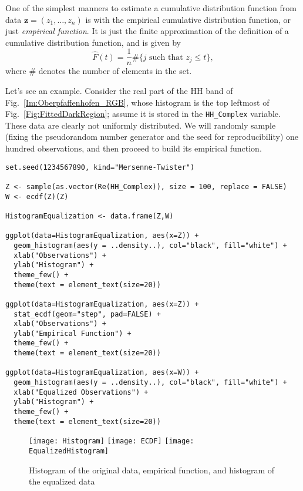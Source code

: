 One of the simplest manners to estimate a cumulative distribution function from data $\bm z=(z_1,\dots,z_n)$ is with the empirical cumulative distribution function, or just \textit{empirical function}.
It is just the finite approximation of the definition of a cumulative distribution function, and is given by
\begin{equation}
\widehat{F}(t) = \frac1n \#\{j \text{ such that } z_j\leq t\} ,
\end{equation}
where $\#$ denotes the number of elements in the set.

Let's see an example.
Consider the real part of the HH band of Fig.~\ref{Im:Oberpfaffenhofen_RGB}, whose histogram is the top leftmost of Fig.~\ref{Fig:FittedDarkRegion}; assume it is stored in the \verb|HH_Complex| variable.
These data are clearly not uniformly distributed.
We will randomly sample (fixing the pseudorandom number generator and the seed for reproducibility) one hundred observations, and then proceed to build its empirical function.

\begin{lstlisting}[frame=tb]
set.seed(1234567890, kind="Mersenne-Twister")

Z <- sample(as.vector(Re(HH_Complex)), size = 100, replace = FALSE)
W <- ecdf(Z)(Z)

HistogramEqualization <- data.frame(Z,W)
 
ggplot(data=HistogramEqualization, aes(x=Z)) +
  geom_histogram(aes(y = ..density..), col="black", fill="white") +
  xlab("Observations") +
  ylab("Histogram") + 
  theme_few() +
  theme(text = element_text(size=20))

ggplot(data=HistogramEqualization, aes(x=Z)) +
  stat_ecdf(geom="step", pad=FALSE) +
  xlab("Observations") +
  ylab("Empirical Function") + 
  theme_few() +
  theme(text = element_text(size=20))

ggplot(data=HistogramEqualization, aes(x=W)) +
  geom_histogram(aes(y = ..density..), col="black", fill="white") +
  xlab("Equalized Observations") +
  ylab("Histogram") + 
  theme_few() +
  theme(text = element_text(size=20))
\end{lstlisting}

\begin{figure*}[hbt]
\centering
\texttt{[image: Histogram]}
\texttt{[image: ECDF]}
\texttt{[image: EqualizedHistogram]}
\caption{Histogram of the original data, empirical function, and histogram of the equalized data}
\end{figure*}

